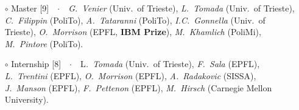 \documentclass[
  usegeometry%
]{scrartcl}
\begin{document}
\begin{cv}{}
{\begin{itemize}
    \item[$\circ$] {\color{PineGreen}Master} [9]\ \ $\cdotp$\ \  \textit{G.\ Venier} (Univ.\ of Trieste), \textit{L.\ Tomada} (Univ.\ of Trieste), \textit{C.\ Filippin} (PoliTo), \textit{A.\ Tataranni} (PoliTo), \textit{I.C.\ Gonnella} (Univ.\ of Trieste), \textit{O.\ Morrison} (EPFL, \textbf{IBM Prize}), \textit{M.\ Khamlich} (PoliMi), \textit{M.\ Pintore} (PoliTo).
    \item[$\circ$] {\color{NavyBlue}Internship} [8]\ \ $\cdotp$\ \  L\textit{.\ Tomada} (Univ.\ of Trieste), \textit{F.\ Sala} (EPFL), \textit{L.\ Trentini} (EPFL), \textit{O.\ Morrison} (EPFL), \textit{A.\ Radakovic} (SISSA), \textit{J.\ Manson} (EPFL), \textit{F.\ Pettenon} (EPFL), \textit{M.\ Hirsch} (Carnegie Mellon University).
\end{itemize}}
\vspace{-0.5em}


\end{cv}
\end{document}
